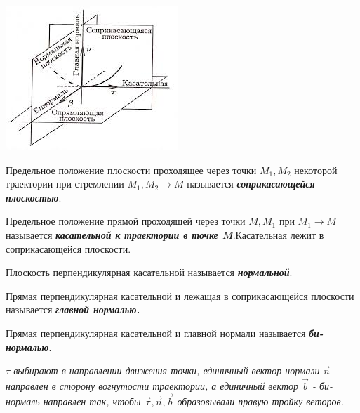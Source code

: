 \begin{enumerate}
\begin{enumerate}
\begin{center}
                        \includegraphics[]{images.jpeg}
                    \end{center}
                    \vspace{5px}

                     Предельное положение плоскости проходящее через точки $M_1,M_2$ некоторой траектории при стремлении $M_1,M_2 \to M$ называется \textbf{\textit{соприкасающейся плоскостью}}.

                    \vspace{5px}

                     Предельное положение прямой проходящей через точки $M,M_1$ при $M_1 \to M$ называется \textbf{\textit{касательной к траектории в точке M}}.Касательная лежит в соприкасающейся плоскости.

                    \vspace{5px}

                     Плоскость перпендикулярная касательной называется \textbf{\textit{нормальной}}.

                    \vspace{5px}

                     Прямая перпендикулярная касательной и лежащая в соприкасающейся плоскости называется \textbf{\textit{главной нормалью.}}

                    \vspace{5px}

                     Прямая перпендикулярная касательной и главной нормали называется \textbf{\textit{би-нормалью}}.

                    \vspace{5px}

                    \textit{$\tau$ выбирают в направлении движения точки, единичный вектор нормали $\vec n$ направлен в сторону вогнутости траектории, а единичный вектор $\vec b$ - би-нормаль направлен так, чтобы $\vec \tau, \vec n, \vec b$ образовывали правую тройку веторов.}


\end{enumerate}
\end{enumerate}
